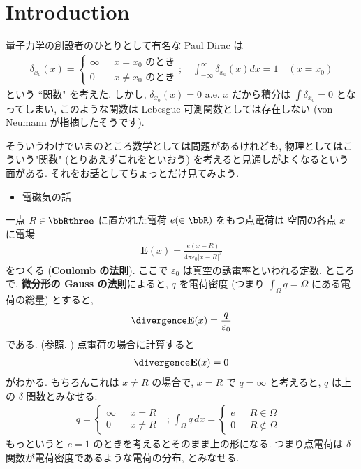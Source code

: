 \documentclass[openany, a4paper, oneside]{jsbook}
\begin{document}
\section{Introduction}

量子力学の創設者のひとりとして有名な Paul Dirac は
\begin{align}
 \delta_{x_0}(x)
 =
 \begin{cases}
  \infty & \text{ $x = x_0$ のとき} \\
  0 & \text{ $x \neq x_0$ のとき}
 \end{cases}; \quad
 \int_{-\infty}^{\infty} \delta_{x_0} (x) dx
 =
 1 \quad (x = x_0)
\end{align}
という ``関数" を考えた.
しかし, $\delta_{x_0}(x) = 0$ a.e. $x$ だから積分は $\int\delta_{x_0} = 0$ となってしまい,
このような関数は Lebesgue 可測関数としては存在しない (von Neumann が指摘したそうです).

そういうわけでいまのところ数学としては問題があるけれども,
物理としてはこういう"関数" (とりあえずこれをといおう) を考えると見通しがよくなるという面がある.
それをお話としてちょっとだけ見てみよう.

\begin{itemize}
\item 電磁気の話
\end{itemize}
一点 $R \in \bbRthree$ に置かれた電荷 $e (\in \bbR)$ をもつ点電荷は
空間の各点 $x$ に電場
\begin{align}
 \mathbf{E}(x)
 =
 \frac{e (x - R)}{4\pi \varepsilon_0 |x - R|^3}
\end{align}
をつくる (\textbf{Coulomb の法則}).
ここで $\varepsilon_0$ は真空の誘電率といわれる定数.
ところで, \textbf{微分形の Gauss の法則}によると,
$q$ を電荷密度 (つまり $\int_{\Omega}q = \Omega$ にある電荷の総量) とすると,
\begin{align}
 \divergence \mathbf{E}(x)
 =
 \frac{q}{\varepsilon_0}
\end{align}
である. (\cite{ShigenobuSunagawa2}参照. )
点電荷の場合に計算すると
\begin{align}
 \divergence \mathbf{E}(x) = 0
\end{align}
がわかる.
もちろんこれは $x \neq R$ の場合で,
$x = R$ で $q = \infty$ と考えると,
$q$ は上の $\delta$ 関数とみなせる:
\begin{align}
 q
 =
 \begin{cases}
  \infty & \text{ $x = R$ } \\
  0 & \text{ $x \neq R$ }
 \end{cases}; \,
 \int_{\Omega}q \, dx
 =
 \begin{cases}
  e & \text{ $R\in \Omega$ } \\
  0 & \text{ $R \not\in \Omega$ }
 \end{cases}
\end{align}
もっというと $e = 1$ のときを考えるとそのまま上の形になる.
つまり点電荷は $\delta$ 関数が電荷密度であるような電荷の分布, とみなせる.
\end{document}
